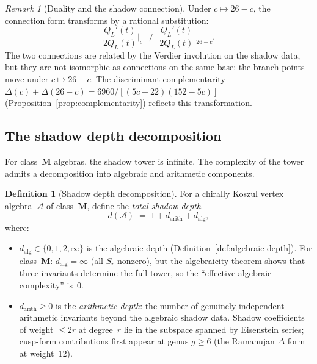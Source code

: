 \documentclass[11pt,reqno]{amsart}
\theoremstyle{definition}
\newtheorem{definition}[theorem]{Definition}
\theoremstyle{remark}
\newtheorem{remark}[theorem]{Remark}
\newcommand{\cA}{\mathcal{A}}
\numberwithin{equation}{section}
\begin{document}
\begin{remark}[Duality and the shadow
connection]\label{rem:duality-conn}
Under $c \mapsto 26 - c$, the connection
form transforms by a rational substitution:
\[
 \frac{Q_L'(t)}{2Q_L(t)}\bigg|_{c}
 \;\ne\;
 \frac{Q_L'(t)}{2Q_L(t)}\bigg|_{26-c}.
\]
The two connections are related by the Verdier involution
on the shadow data, but they are not isomorphic as
connections on the same base: the branch points move under
$c \mapsto 26 - c$. The discriminant complementarity
$\Delta(c) + \Delta(26-c) = 6960/[(5c+22)(152-5c)]$
(Proposition~\ref{prop:complementarity}) reflects this
transformation.
\end{remark}


\subsection{The shadow depth decomposition}
\label{subsec:depth-decomp}

For class~$\mathbf{M}$ algebras, the shadow tower is
infinite. The complexity of the tower admits a decomposition
into algebraic and arithmetic components.

\begin{definition}[Shadow depth
decomposition]\label{def:depth-decomp}
For a chirally Koszul vertex algebra~$\cA$ of
class~$\mathbf{M}$, define the \emph{total shadow depth}
\[
 d(\cA) \;=\; 1 + d_{\mathrm{arith}} + d_{\mathrm{alg}},
\]
where:
\begin{itemize}
\item $d_{\mathrm{alg}} \in \{0, 1, 2, \infty\}$ is the
 algebraic depth (Definition~\ref{def:algebraic-depth}).
 For class~$\mathbf{M}$: $d_{\mathrm{alg}} = \infty$
 (all $S_r$ nonzero), but the algebraicity theorem shows
 that three invariants determine the full tower, so the
 ``effective algebraic complexity'' is~$0$.
\item $d_{\mathrm{arith}} \ge 0$ is the \emph{arithmetic
 depth}: the number of genuinely independent arithmetic
 invariants beyond the algebraic shadow data. Shadow
 coefficients of weight $\le 2r$ at degree~$r$ lie in the
 subspace spanned by Eisenstein series; cusp-form
 contributions first appear at genus $g \ge 6$ (the
 Ramanujan $\Delta$ form at weight~$12$).
\end{itemize}
\end{definition}
\end{document}
